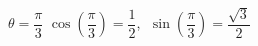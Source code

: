 {$\theta = \dfrac{\pi}{3}$}
{$\cos \left(\dfrac{\pi}{3}\right) = \dfrac{1}{2}$, $\; \sin \left(\dfrac{\pi}{3}\right) = \dfrac{\sqrt{3}}{2}$}
